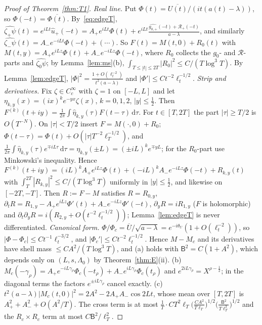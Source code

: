 \documentclass[11pt]{amsart}
\newcommand{\dd}{\,\mathrm{d}}
\theoremstyle{definition}
\theoremstyle{remark}
\numberwithin{equation}{section}
\begin{document}
\begin{proof}[Proof of Theorem~\ref{thm:T1}]
\emph{Real line.} Put $\Phi(t)=\overline{U(t)}/(it(a(t)-\lambda))$, so $\Phi(-t)=\overline{\Phi(t)}$. By~\eqref{eq:edgeT}, $\widehat{\zeta_+\psi}(t)=e^{iLt}\hat u_+(-t)=A_+e^{iLt}\Phi(t)+e^{iLt}\frac{\widehat{g_{0,+}}(-t)+\mathcal R_+(-t)}{a-\lambda}$, and similarly $\widehat{\zeta_-\psi}(t)=A_-e^{-iLt}\Phi(-t)+(\cdots)$. So $F(t)=M(t,0)+R_0(t)$ with $M(t,y)=A_+e^{iLz}\Phi(t)+A_-e^{-iLz}\Phi(-t)$, where $R_0$ collects the $g_0$- and $\mathcal R$-parts and $\widehat{\zeta_0\psi}$; by Lemma~\ref{lem:ms}(b), $\int_{T\le|t|\le2T}|R_0|^2\le C/(T\log^3T)$. By Lemma~\ref{lem:edgeT}, $|\Phi|^2=\frac{1+O(\ell_t^{-2})}{t^2(a-\lambda)}$ and $|\Phi'|\le Ct^{-2}\ell_t^{-1/2}$.
\emph{Strip and derivatives.} Fix $\zeta\in C_c^\infty$ with $\zeta=1$ on $[-L,L]$ and let $\eta_{k,y}(x)=(ix)^ke^{-yx}\zeta(x)$, $k=0,1,2$, $|y|\le\frac12$. Then $F^{(k)}(t+iy)=\frac1{2\pi}\int\hat\eta_{k,y}(\tau)F(t-\tau)\dd\tau$. For $t\in[T,2T]$ the part $|\tau|\ge T/2$ is $O(T^{-N})$. On $|\tau|<T/2$ insert $F=M(\cdot,0)+R_0$; $\Phi(t-\tau)=\Phi(t)+O(|\tau|T^{-2}\ell_T^{-1/2})$, and $\frac1{2\pi}\int\hat\eta_{k,y}(\tau)e^{\mp iL\tau}\dd\tau=\eta_{k,y}(\pm L)=(\pm iL)^ke^{\mp yL}$; for the $R_0$-part use Minkowski's inequality. Hence $F^{(k)}(t+iy)=(iL)^kA_+e^{iLz}\Phi(t)+(-iL)^kA_-e^{-iLz}\Phi(-t)+R_{k,y}(t)$ with $\int_T^{2T}|R_{k,y}|^2\le C/(T\log^3T)$ uniformly in $|y|\le\frac12$, and likewise on $[-2T,-T]$. Then $R:=F-M$ satisfies $R=R_{0,y}$, $\partial_tR=R_{1,y}-A_+e^{iLz}\Phi'(t)+A_-e^{-iLz}\Phi'(-t)$, $\partial_yR=iR_{1,y}$ ($F$ is holomorphic) and $\partial_t\partial_yR=i(R_{2,y}+O(t^{-2}\ell_t^{-1/2}))$; Lemma~\ref{lem:edgeT} is never differentiated.
\emph{Canonical form.} $\Phi/\Phi_c=\overline U/\sqrt{a-\lambda}=e^{-i\theta_U}(1+O(\ell_t^{-2}))$, so $|\Phi-\Phi_c|\le Ct^{-1}\ell_t^{-3/2}$, and $|\Phi_c'|\le Ct^{-2}\ell_t^{-1/2}$. Hence $M-M_c$ and its derivatives have shell mass $\le CA^2/(T\log^3T)$, and (a) holds with $\mathsf B^2=C(1+A^2)$, which depends only on $(L,s,\Lambda_0)$ by Theorem~\ref{thm:E}(ii).
(b) $M_c(-\gamma_\rho)=A_+e^{-iL\gamma_\rho}\Phi_c(-t_\rho)+A_-e^{iL\gamma_\rho}\Phi_c(t_\rho)$ and $e^{2iL\gamma_\rho}=X^{\rho-\frac12}$; in the diagonal terms the factors $e^{\pm iL\gamma_\rho}$ cancel exactly.
(c) $t^2(a-\lambda)|M_c(t,0)|^2=2A^2-2A_+A_-\cos2Lt$, whose mean over $[T,2T]$ is $A_+^2+A_-^2+O(A^2/T)$. The cross term is at most $\frac1T\cdot CT^2\ell_T\bigl(\frac{CA^2}{T\ell_T}\bigr)^{1/2}\bigl(\frac{\mathsf B^2}{T\ell_T^3}\bigr)^{1/2}$ and the $R_c\times R_c$ term at most $C\mathsf B^2/\ell_T^2$.
\end{proof}
\end{document}
